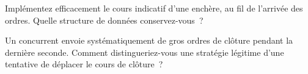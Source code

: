 \begin{interviewq}\label{iq:mx:auction-mechanics-and-theory:5}
Implémentez efficacement le cours indicatif d'une enchère, au fil de l'arrivée des ordres. Quelle structure de données conservez-vous~?
\end{interviewq}

\begin{interviewq}\label{iq:mx:auction-mechanics-and-theory:6}
Un concurrent envoie systématiquement de gros ordres de clôture pendant la dernière seconde. Comment distingueriez-vous une stratégie légitime d'une tentative de déplacer le cours de clôture~?
\end{interviewq}
